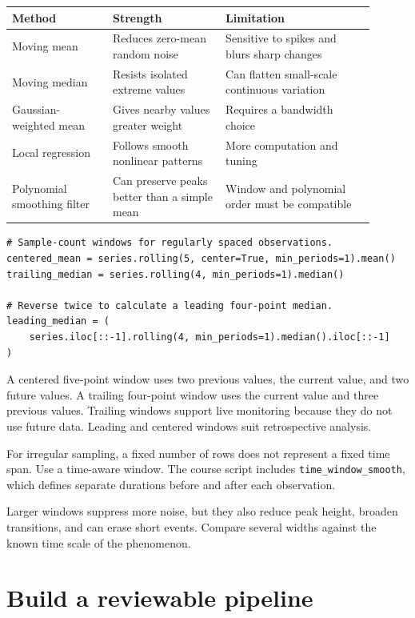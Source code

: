 \documentclass[11pt,letterpaper]{article}
\begin{document}
\begin{center}
\begin{tabular}{@{}p{0.25\linewidth}p{0.28\linewidth}p{0.37\linewidth}@{}}
\toprule
Method & Strength & Limitation \\
\midrule
Moving mean & Reduces zero-mean random noise & Sensitive to spikes and blurs sharp changes \\
Moving median & Resists isolated extreme values & Can flatten small-scale continuous variation \\
Gaussian-weighted mean & Gives nearby values greater weight & Requires a bandwidth choice \\
Local regression & Follows smooth nonlinear patterns & More computation and tuning \\
Polynomial smoothing filter & Can preserve peaks better than a simple mean & Window and polynomial order must be compatible \\
\bottomrule
\end{tabular}
\end{center}

\begin{lstlisting}
# Sample-count windows for regularly spaced observations.
centered_mean = series.rolling(5, center=True, min_periods=1).mean()
trailing_median = series.rolling(4, min_periods=1).median()

# Reverse twice to calculate a leading four-point median.
leading_median = (
    series.iloc[::-1].rolling(4, min_periods=1).median().iloc[::-1]
)
\end{lstlisting}

A centered five-point window uses two previous values, the current value, and
two future values. A trailing four-point window uses the current value and three
previous values. Trailing windows support live monitoring because they do not
use future data. Leading and centered windows suit retrospective analysis.

For irregular sampling, a fixed number of rows does not represent a fixed time
span. Use a time-aware window. The course script includes
\texttt{time\_window\_smooth}, which defines separate durations before and after
each observation.

Larger windows suppress more noise, but they also reduce peak height, broaden
transitions, and can erase short events. Compare several widths against the
known time scale of the phenomenon.

\section{Build a reviewable pipeline}
\end{document}
